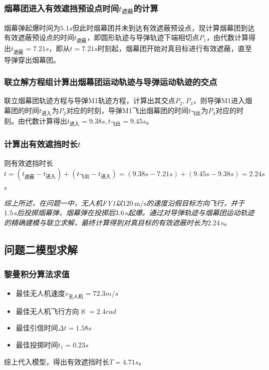 \documentclass{article}
\begin{document}
\subsubsection{烟幕团进入有效遮挡预设点时间$t_\text{遮蔽}$的计算}
烟幕弹起爆时间为$5.1s$但此时烟幕团并未到达有效遮蔽预设点，现计算烟幕团到达有效遮蔽预设点的时间$t_\text{遮蔽}$，即圆形轨迹与导弹轨迹下端相切点$P_1$，由代数计算得出$t_\text{遮蔽} = 7.21s$，即从$t=7.21s$时刻起，烟幕团开始对真目标进行有效遮蔽，直至导弹穿出烟幕团。

\subsubsection{联立解方程组计算出烟幕团运动轨迹与导弹运动轨迹的交点}
联立烟幕团轨迹方程与导弹M1轨迹方程，计算出其交点$P_2,P_3$，则导弹M1进入烟幕团的时间$t_{\text{进入}}$为$P_2$对应的时刻，导弹M1飞出烟幕团的时间$t_{\text{飞出}}$为$P_3$对应的时刻。由代数计算得出$t_{\text{进入}} = 9.38s,t_{\text{飞出}} = 9.45s$。

\subsubsection{计算出有效遮挡时长$t$}
则有效遮挡时长$t =(t_\text{遮蔽}- t_\text{进入}) + (t_{\text{飞出}} - t_{\text{进入}}) = (9.38s - 7.21s) + (9.45s - 9.38s) = 2.24s$。

\textit{综上所述，在问题一中，无人机FY1以$120\,\mathrm{m/s}$的速度沿假目标方向飞行，并于$1.5\,\mathrm{s}$后投掷烟幕弹，烟幕弹在投掷后$3.6\,\mathrm{s}$起爆。通过对导弹轨迹与烟幕团运动轨迹的精确建模与联立求解，最终计算得到对真目标的有效遮蔽时长为$2.24\,\mathrm{s}$。}

\subsection{问题二模型求解}
\subsubsection{黎曼积分算法求值}
\begin{itemize}
    \item 最佳无人机速度$v_\text{无人机}=72.3m /s$
    \item 最佳无人机飞行方向$\aleph = 2.4rad$
    \item 最佳引信时间$\Delta t = 1.58s$
    \item 最佳投掷时间$t_1 = 0.23s$
\end{itemize}
综上代入模型，得出有效遮挡时长$T = 4.71s$。
\end{document}
